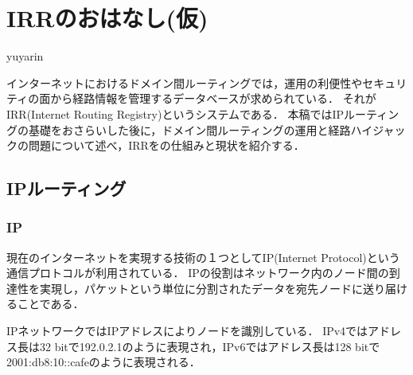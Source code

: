 
\chapter{IRRのおはなし(仮)}

\begin{flushright}
 yuyarin %
\end{flushright}



インターネットにおけるドメイン間ルーティングでは，運用の利便性やセキュリティの面から経路情報を管理するデータベースが求められている．
それがIRR(Internet Routing Registry)というシステムである．
本稿ではIPルーティングの基礎をおさらいした後に，ドメイン間ルーティングの運用と経路ハイジャックの問題について述べ，IRRをの仕組みと現状を紹介する．

%

\section{IPルーティング}

\subsection{IP}

現在のインターネットを実現する技術の１つとしてIP(Internet Protocol)という通信プロトコルが利用されている．
IPの役割はネットワーク内のノード間の到達性を実現し，パケットという単位に分割されたデータを宛先ノードに送り届けることである．

IPネットワークではIPアドレスによりノードを識別している．
IPv4ではアドレス長は32 bitで192.0.2.1のように表現され，IPv6ではアドレス長は128 bitで2001:db8:10::cafeのように表現される．

